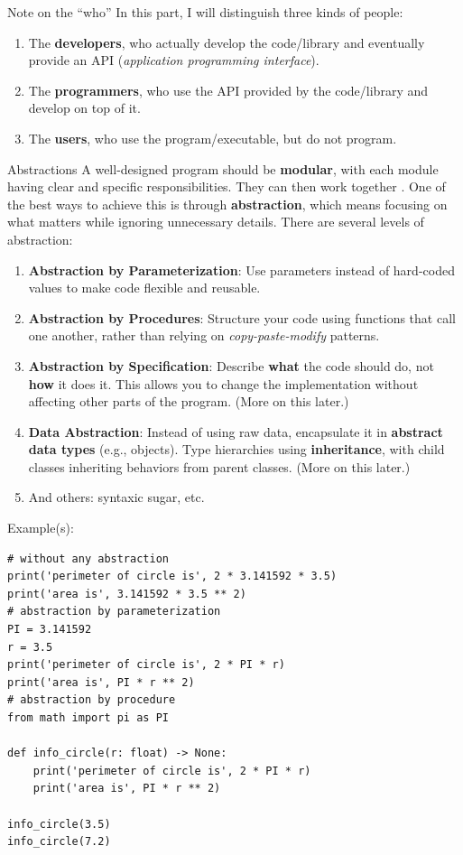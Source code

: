 \documentclass[10pt,
aspectratio=169
]{beamer}
\begin{document}
\begin{frame}{Note on the ``who''}
	In this  part, I will distinguish three kinds of people:\begin{enumerate}
		\item The \textbf{developers}, who actually develop the code/library and eventually provide an API (\textit{application programming interface}).
		\item The \textbf{programmers}, who use the API provided by the code/library and develop on top of it.
		\item The \textbf{users}, who use the program/executable, but do not program.
	\end{enumerate}
\end{frame}

\begin{frame}{Abstractions}
	A well-designed program should be \textbf{modular}, with each module having clear and specific responsibilities. They can then work together . One of the best ways to achieve this is through \textbf{abstraction}, which means focusing on what matters while ignoring unnecessary details. There are several levels of abstraction:
	\begin{enumerate}
		\item \textbf{Abstraction by Parameterization}: Use parameters instead of hard-coded values to make code flexible and reusable.
		\item \textbf{Abstraction by Procedures}: Structure your code using functions that call one another, rather than relying on \textit{copy-paste-modify} patterns.
		\item \textbf{Abstraction by Specification}: Describe \textbf{what} the code should do, not \textbf{how} it does it. This allows you to change the implementation without affecting other parts of the program. (More on this later.)
		\item \textbf{Data Abstraction}: Instead of using raw data, encapsulate it in \textbf{abstract data types} (e.g., objects). Type hierarchies using \textbf{inheritance}, with child classes inheriting behaviors from parent classes. (More on this later.)
		\item And others: syntaxic sugar, etc.
	\end{enumerate}
\end{frame}

\begin{frame}[fragile]
	Example(s):
	\begin{verbatim}
# without any abstraction
print('perimeter of circle is', 2 * 3.141592 * 3.5)
print('area is', 3.141592 * 3.5 ** 2)
# abstraction by parameterization
PI = 3.141592
r = 3.5
print('perimeter of circle is', 2 * PI * r)
print('area is', PI * r ** 2)
# abstraction by procedure
from math import pi as PI

def info_circle(r: float) -> None:
	print('perimeter of circle is', 2 * PI * r)
	print('area is', PI * r ** 2)

info_circle(3.5)
info_circle(7.2)
\end{verbatim}
\end{frame}
\end{document}
